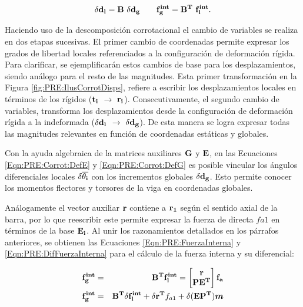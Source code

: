 \begin{equation}\label{Eqn:PRE:CambioCoord}
	\bf{\delta d_l}=\bf{B}~\bf{\delta d_g} ~~~~~~ 	\bf{f_g^{int}}=\bf{B}^T~\bf{ f_l^{int}}.
\end{equation}


Haciendo uso de la descomposición corrotacional el cambio de variables se realiza en dos etapas sucesivas. El primer cambio de coordenadas permite expresar los grados de libertad locales referenciados a la configuración de deformación rígida. Para clarificar, se ejemplificarán estos cambios de base para los desplazamientos, siendo análogo para el resto de las magnitudes. Esta primer transformación en la Figura \ref{fig:PRE:IlusCorrotDisps}, refiere a escribir los desplazamientos locales en términos de los rígidos ($\bf{t_i}$ $\rightarrow$ $\bf{r_i}$). Consecutivamente, el segundo cambio de variables, transforma los desplazamientos desde la configuración de deformación rígida a la indeformada ($\delta \bf{d_l}$ $\rightarrow$ $\delta \bf{d_g}$). De esta manera se logra expresar todas las magnitudes relevantes en función de coordenadas estáticas y globales.

Con la ayuda algebraica de la matrices auxiliares $\bf{G}$ y $\bf{E}$, en las Ecuaciones \eqref{Eqn:PRE:Corrot:DefE} y \eqref{Eqn:PRE:Corrot:DefG} es posible vincular los ángulos diferenciales locales $\delta\bf{\overline{\theta_i}}$ con los incrementos globales $\delta \bf{d_g}$. Esto permite conocer los momentos flectores y torsores de la viga en coordenadas globales.

Análogamente el vector auxiliar $\bf{r}$ contiene a $\bf{r}_1$ según el sentido axial de la barra, por lo que reescribir este permite expresar la fuerza de directa $fa1$  en términos de la base $\bf{E_i}$. Al unir los razonamientos detallados en los párrafos anteriores, se obtienen las Ecuaciones \eqref{Eqn:PRE:FuerzaInterna} y \eqref{Eqn:PRE:DifFuerzaInterna} para el cálculo de la fuerza interna y su diferencial:

\begin{eqnarray}\label{Eqn:PRE:FuerzaInterna}
	\bf{f_g^{int}}&=&\bf{B}^T\bf{f_l^{int}}= \begin{bmatrix}
		\bf{r}\\
		\bf{PE^T}
	\end{bmatrix}\bf{f_a}\\
    \label{Eqn:PRE:DifFuerzaInterna}
	\bf{f_g^{int}}&=&\bf{B}^T\delta\bf{f_l^{int}}+\delta\bf{r}^T \text{$f_{a1}$}+\delta(\bf{EP^T}) \boldsymbol{m}
\end{eqnarray}

